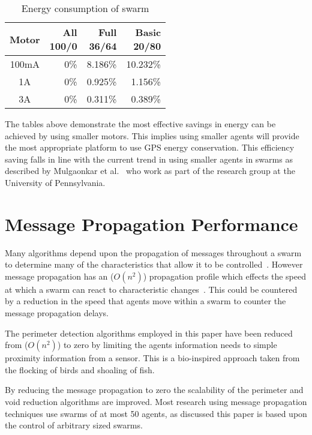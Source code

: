 \documentclass{ieeeaccess}
\begin{document}
\begin{table}
\begin{center}
\begin{tabular}{| c | r | r | r |}
\hline
{\parbox{1.5cm}{\centering Motor}} & {\parbox{1cm}{\centering All\\100/0}} & {\parbox{1,5cm}{\centering Full\\36/64}} & {\parbox{1.5cm}{\centering Basic \\20/80}} \\ \hline
100mA & 0\% & 8.186\% & 10.232\% \\ \hline
1A    & 0\% & 0.925\% &  1.156\% \\ \hline
3A    & 0\% & 0.311\% &  0.389\% \\ \hline
\end{tabular}\caption{Energy consumption of swarm} \label{tab:Energy3}
\end{center}
\end{table}

The tables above demonstrate the most effective savings in energy can be achieved by using smaller motors. This implies using smaller agents will provide the most appropriate platform to use GPS energy conservation. This efficiency saving falls in line with the current trend in using smaller agents in swarms as described by Mulgaonkar et al.~\cite{KV:16,MCK:15} who work as part of the research group at the University of Pennsylvania.

\section{Message Propagation Performance}\label{sec:MessagePropogation}
Many algorithms depend upon the propagation of messages throughout a swarm to determine many of the characteristics that allow it to be controlled~\cite{MD:09}. However message propagation has an ($O(n^2)$) propagation profile which effects the speed at which a swarm can react to characteristic changes~\cite{SHA:07}. This could be countered by a reduction in the speed that agents move within a swarm to counter the message propagation delays. 

The perimeter detection algorithms employed in this paper have been reduced from ($O(n^2)$) to zero by limiting the agents information needs to simple proximity information from a sensor. This is a bio-inspired approach taken from the flocking of birds and shoaling of fish.

By reducing the message propagation to zero the scalability of the perimeter and void reduction algorithms are improved. Most research using message propagation techniques use swarms of at most 50 agents, as discussed this paper is based upon the control of arbitrary sized swarms.
\end{document}
